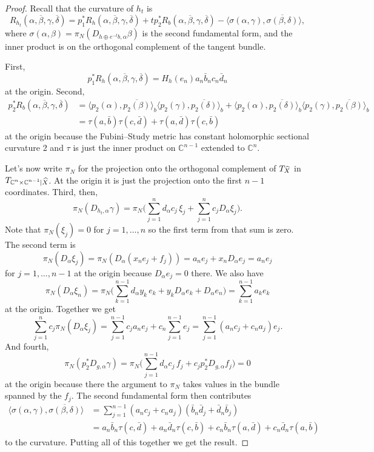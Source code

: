 \documentclass[10pt,a4paper]{amsart}
\newcommand{\kk}[1]{\mathbb{#1}}
\def\<{\langle}
\def\>{\rangle}
\def\ov#1{\overline{#1}}
\def\hsc{holomorphic sectional curvature}
\def\bl#1{\widehat{#1}}
\def\blX{\bl{X}}
\begin{document}
\begin{proof}
Recall that the curvature of $h_t$ is
$$
R_{h_t}(\alpha, \ov\beta, \gamma, \ov\delta)
= p_1^* R_h(\alpha, \ov\beta, \gamma, \ov\delta)
+ t p_2^* R_b(\alpha, \ov\beta, \gamma, \ov\delta)
- \<\sigma(\alpha, \gamma), \ov{\sigma(\beta, \delta)}\>,
$$
where $\sigma(\alpha, \beta) = \pi_N(D_{h \oplus e^{-t} b,\alpha} \beta)$ is
the second fundamental form, and the inner product is on the orthogonal complement
of the tangent bundle.

First,
$$
p_1^*R_h(\alpha, \ov\beta, \gamma, \ov\delta)
= H_h(e_n) a_n \bar b_n c_n \bar d_n
$$
at the origin. Second,
\begin{align*}
p_2^*R_b(\alpha, \ov\beta, \gamma, \ov\delta)
&= \< p_2(\alpha), \ov{p_2(\beta)} \>_b
\< p_2(\gamma), \ov{p_2(\delta)} \>_b
+ \< p_2(\alpha), \ov{p_2(\delta)} \>_b
\< p_2(\gamma), \ov{p_2(\beta)} \>_b
\\
&= \tau(a, \bar b) \tau(c, \bar d) + \tau(a, \bar d) \tau(c, \bar b)
\end{align*}
at the origin
because the Fubini--Study metric has constant \hsc{} 2
and $\tau$ is just the inner product on $\kk C^{n-1}$ extended to $\kk C^n$.

Let's now write $\pi_N$ for the projection onto the orthogonal complement of
$T_{\smash{\blX}}$ in $T_{\smash{\kk C^n \times \kk C^{n-1}|\blX}}$.
At the origin it is just the projection onto the first $n-1$ coordinates.
Third, then,
$$
\pi_N(D_{h_t,\alpha} \gamma)
= \pi_N\biggl(
\sum_{j=1}^{n} d_{\alpha} c_j \, \xi_j
+ \sum_{j=1}^n c_j D_{\alpha} \xi_j
\biggr).
$$
Note that $\pi_N(\xi_j) = 0$ for $j=1,\ldots,n$ so the first term from that sum
is zero. The second term is
$$
\pi_N(D_{\alpha} \xi_j)
= \pi_N(D_{\alpha}(x_n e_j + f_j))
= a_n e_j + x_n D_{\alpha} e_j
= a_n e_j
$$
for $j=1,\ldots,n-1$ at the origin because $D_{\alpha} e_j = 0$ there.
We also have
$$
\pi_N(D_{\alpha} \xi_n)
= \pi_N\biggl(
\sum_{k=1}^{n-1} d_{\alpha} y_k \, e_k + y_k D_{\alpha} e_k
+ D_{\alpha} e_n
\biggr)
= \sum_{k=1}^{n-1} a_k e_k
$$
at the origin.
Together we get
$$
\sum_{j=1}^n c_j \pi_N(D_{\alpha} \xi_j)
= \sum_{j=1}^{n-1} c_j a_n e_j + c_n \sum_{j=1}^{n-1} e_j
= \sum_{j=1}^{n-1} (a_n c_j + c_n a_j) e_j.
$$
And fourth,
$$
\pi_N(p_2^*D_{g,\alpha} \gamma)
= \pi_N \biggl(
\sum_{j=1}^{n-1} d_\alpha c_j \, f_j
+ c_j p_2^*D_{g,\alpha} f_j \biggr) = 0
$$
at the origin because there the argument to $\pi_N$ takes values in the bundle
spanned by the $f_j$.
The second fundamental form then contributes
\begin{align*}
\<\sigma(\alpha, \gamma), \ov{\sigma(\beta, \delta)}\>
&=
\sum_{j=1}^{n-1} (a_n c_j + c_n a_j) (\bar b_n \bar d_j + \bar d_n \bar b_j)
\\
&= a_n \bar b_n \tau(c, \bar d)
+ a_n \bar d_n \tau(c, \bar b)
+ c_n \bar b_n \tau(a, \bar d)
+ c_n \bar d_n \tau(a, \bar b)
\end{align*}
to the curvature. Putting all of this together we get the result.
\end{proof}
\end{document}
